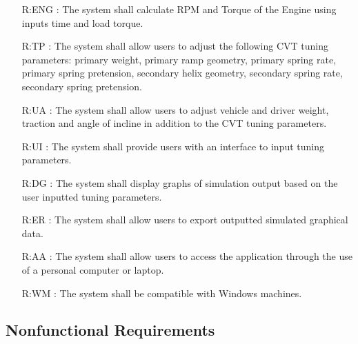 \documentclass[12pt]{article}
\begin{document}
\begin{itemize}
\item[R:ENG \label{R:ENG}:] The system shall calculate RPM and Torque of the Engine using inputs time and load torque.

\item[R:TP \label{R:TP}:] The system shall allow users to adjust the following CVT tuning parameters: primary weight, primary ramp geometry, primary spring rate, primary spring pretension, secondary helix geometry, secondary spring rate, secondary spring pretension. 

\item[R:UA \label{R:UA}:] The system shall allow users to adjust vehicle and driver weight, traction and angle of incline in addition to the CVT tuning parameters.

\item[R:UI \label{R:UI}:] The system shall provide users with an interface to input tuning parameters.

\item[R:DG \label{R:DG}:] The system shall display graphs of simulation output based on the user inputted tuning parameters.

\item[R:ER \label{R:ER}:] The system shall allow users to export outputted simulated graphical data.

\item[R:AA \label{R:AA}:] The system shall allow users to access the application through the use of a personal computer or laptop.

\item[R:WM \label{R:WM}:] The system shall be compatible with Windows machines. 
\end{itemize}

\subsection{Nonfunctional Requirements}
\end{document}
